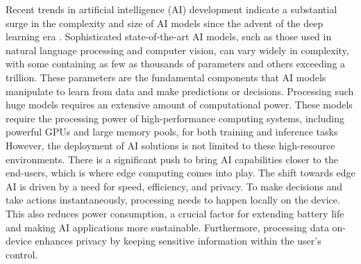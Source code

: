 Recent trends in artificial intelligence (AI) development indicate a substantial surge in the complexity and size of AI models since the advent of the deep learning era \autocite{EpochDatabaseVisualization}.
Sophisticated state-of-the-art AI models, such as those used in natural language processing and computer vision, can vary widely in complexity, with some containing as few as thousands of parameters and others exceeding a trillion.
These parameters are the fundamental components that AI models manipulate to learn from data and make predictions or decisions.
Processing such huge models requires an extensive amount of computational power.
These models require the processing power of high-performance computing systems, including powerful GPUs and large memory pools, for both training and inference tasks
However, the deployment of AI solutions is not limited to these high-resource environments.
There is a significant push to bring AI capabilities closer to the end-users, which is where edge computing comes into play.
The shift towards edge AI is driven by a need for speed, efficiency, and privacy. 
To make decisions and take actions instantaneously, processing needs to happen locally on the device.
This also reduces power consumption, a crucial factor for extending battery life and making AI applications more sustainable. 
Furthermore, processing data on-device enhances privacy by keeping sensitive information within the user's control.
